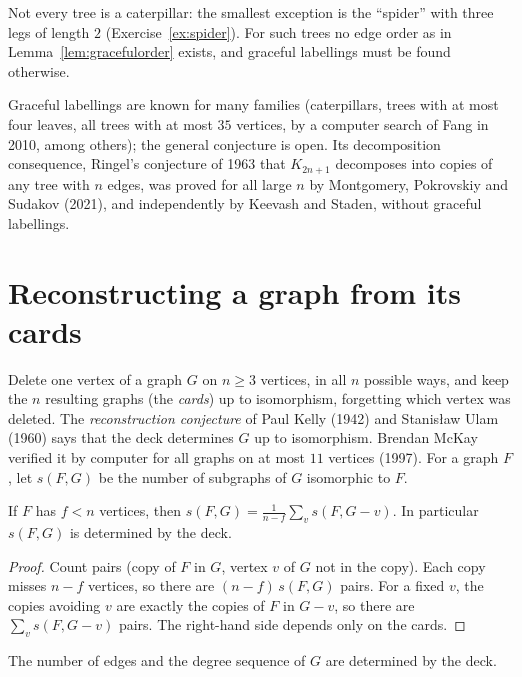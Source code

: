 Not every tree is a caterpillar: the smallest exception is the ``spider'' with three legs of length $2$ (Exercise~\ref{ex:spider}). For such trees no edge order as in Lemma~\ref{lem:gracefulorder} exists, and graceful labellings must be found otherwise.

\begin{remark}\label{rem:graceful}
Graceful labellings are known for many families (caterpillars, trees with at most four leaves, all trees with at most $35$ vertices, by a computer search of Fang in 2010, among others); the general conjecture is open. Its decomposition consequence, Ringel's conjecture of 1963 that $K_{2n+1}$ decomposes into copies of any tree with $n$ edges, was proved for all large $n$ by Montgomery, Pokrovskiy and Sudakov (2021), and independently by Keevash and Staden, without graceful labellings.
\end{remark}

\section{Reconstructing a graph from its cards}

Delete one vertex of a graph $G$ on $n\ge3$ vertices, in all $n$ possible ways, and keep the $n$ resulting graphs (the \emph{cards}) up to isomorphism, forgetting which vertex was deleted. The \emph{reconstruction conjecture} of Paul Kelly (1942) and Stanis\l aw Ulam (1960) says that the deck determines $G$ up to isomorphism. Brendan McKay verified it by computer for all graphs on at most $11$ vertices (1997). For a graph $F$, let $s(F,G)$ be the number of subgraphs of $G$ isomorphic to $F$.

\begin{lemma}\label{lem:kelly}
If $F$ has $f<n$ vertices, then $s(F,G)=\frac1{n-f}\sum_v s(F,G-v)$. In particular $s(F,G)$ is determined by the deck.
\end{lemma}

\begin{proof}
Count pairs (copy of $F$ in $G$, vertex $v$ of $G$ not in the copy). Each copy misses $n-f$ vertices, so there are $(n-f)\,s(F,G)$ pairs. For a fixed $v$, the copies avoiding $v$ are exactly the copies of $F$ in $G-v$, so there are $\sum_v s(F,G-v)$ pairs. The right-hand side depends only on the cards.
\end{proof}

\begin{corollary}\label{cor:kelly}
The number of edges and the degree sequence of $G$ are determined by the deck.
\end{corollary}

